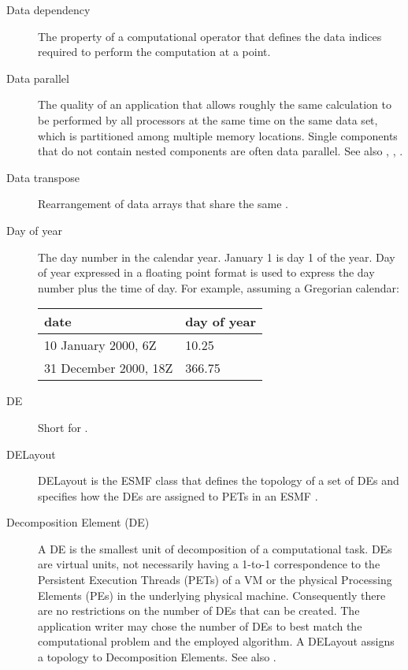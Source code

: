 \begin{description}
\label{glos:DataDep}
\item[Data dependency] The property of a computational
  operator that defines the data indices required to perform
  the computation at a point.  

\label{glos:DataParallel}
\item[Data parallel] The quality of an application that allows roughly 
  the same calculation to be performed by all processors at the same 
  time on the same data set, which is partitioned among multiple memory 
  locations.  Single components that do not contain nested components
  are often data parallel.  See also 
  , , 
  .   

\label{glos:DataTranspose}
\item[Data transpose] Rearrangement of data arrays that share the 
  same .  

\label{glos:DayOfYear}
\item[Day of year] The day number in the calendar year. 
  January 1 is day 1 of the year. Day of year expressed in a floating point 
  format is used to express the day number plus the time of day. 
  For example, assuming a Gregorian calendar:

\begin{tabular}{ll}
  {\bf date}              & {\bf day of year} \\
  \hline 
  10 January 2000, 6Z     & 10.25 \\
  31 December 2000, 18Z   & 366.75 
\end{tabular}

\label{glos:DE}
\item[DE] 
  Short for .

\label{glos:DELayout}
\item[DELayout] DELayout is the ESMF class that
  defines the topology of a set of DEs and specifies 
  how the DEs are assigned to PETs in an ESMF  
  . 

\label{glos:Decomp_Element}
\item[Decomposition Element (DE)]
  A DE is the smallest unit of decomposition of a
  computational task.  DEs are virtual units, not necessarily having 
  a 1-to-1 correspondence to the Persistent Execution Threads (PETs)
  of a VM or the physical Processing Elements (PEs) in the underlying
  physical machine. Consequently there are no restrictions on the 
  number of DEs that can be created. The application writer may chose
  the number of DEs to best match the computational problem and the
  employed algorithm.  A DELayout assigns a topology to
  Decomposition Elements.
  See also .


\end{description}
